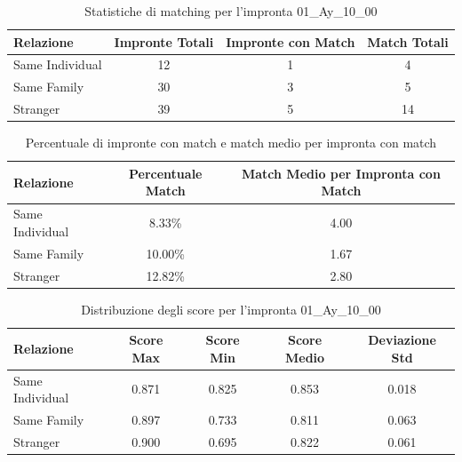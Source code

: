 \begin{table}[htbp]
\centering
\caption{Statistiche di matching per l'impronta 01\_Ay\_10\_00}
\label{tab:results_01_Ay_10_00}
\begin{tabular}{|l|c|c|c|}
\hline
\textbf{Relazione} & \textbf{Impronte Totali} & \textbf{Impronte con Match} & \textbf{Match Totali} \\
\hline
Same Individual & 12 & 1 & 4 \\
\hline
Same Family & 30 & 3 & 5 \\
\hline
Stranger & 39 & 5 & 14 \\
\hline
\end{tabular}
\end{table}


\begin{table}[htbp]
\centering
\caption{Percentuale di impronte con match e match medio per impronta con match}
\label{tab:match_percentage_01_Ay_10_00}
\begin{tabular}{|l|c|c|}
\hline
\textbf{Relazione} & \textbf{Percentuale Match} & \textbf{Match Medio per Impronta con Match} \\
\hline
Same Individual & 8.33\% & 4.00 \\
\hline
Same Family & 10.00\% & 1.67 \\
\hline
Stranger & 12.82\% & 2.80 \\
\hline
\end{tabular}
\end{table}


\begin{table}[htbp]
\centering
\caption{Distribuzione degli score per l'impronta 01\_Ay\_10\_00}
\label{tab:scores_01_Ay_10_00}
\begin{tabular}{|l|c|c|c|c|}
\hline
\textbf{Relazione} & \textbf{Score Max} & \textbf{Score Min} & \textbf{Score Medio} & \textbf{Deviazione Std} \\
\hline
Same Individual & 0.871 & 0.825 & 0.853 & 0.018 \\
\hline
Same Family & 0.897 & 0.733 & 0.811 & 0.063 \\
\hline
Stranger & 0.900 & 0.695 & 0.822 & 0.061 \\
\hline
\end{tabular}
\end{table}

